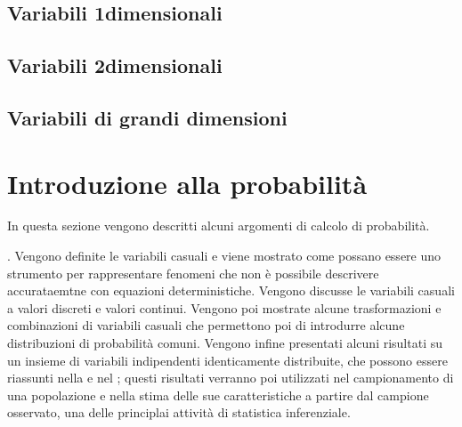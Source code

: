 \documentclass[letterpaper,10pt,italian]{jupyterBook}
\begin{document}
\section{Variabili 1\sphinxhyphen{}dimensionali}
\label{\detokenize{ch/statistics/descriptive:variabili-1-dimensionali}}

\section{Variabili 2\sphinxhyphen{}dimensionali}
\label{\detokenize{ch/statistics/descriptive:variabili-2-dimensionali}}

\section{Variabili di grandi dimensioni}
\label{\detokenize{ch/statistics/descriptive:variabili-di-grandi-dimensioni}}
\sphinxstepscope


\chapter{Introduzione alla probabilità}
\label{\detokenize{ch/statistics/probability:introduzione-alla-probabilita}}\label{\detokenize{ch/statistics/probability:statistics-hs-probability}}\label{\detokenize{ch/statistics/probability::doc}}
\sphinxAtStartPar
In questa sezione vengono descritti alcuni argomenti di calcolo di probabilità.

\sphinxAtStartPar
{\hyperref[\detokenize{ch/statistics/random_variables:statistics-hs-random-variables}]{}}. Vengono definite le variabili casuali e viene mostrato come possano essere uno strumento per rappresentare fenomeni che non è possibile descrivere accurataemtne con equazioni deterministiche. Vengono discusse le variabili casuali a valori discreti e valori continui. Vengono poi mostrate alcune trasformazioni e combinazioni di variabili casuali che permettono poi di introdurre alcune distribuzioni di probabilità comuni. Vengono infine presentati alcuni risultati su un insieme di variabili indipendenti identicamente distribuite, che possono essere riassunti nella  e nel ; questi risultati verranno poi utilizzati nel campionamento di una popolazione e nella stima delle sue caratteristiche a partire dal campione osservato, una delle principlai attività di statistica inferenziale.
\end{document}

